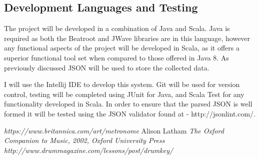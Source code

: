 \documentclass[a4paper, 11pt]{article}
\begin{document}
\subsection{Development Languages and Testing}
The project will be developed in a combination of Java and Scala. Java is required as both the Beatroot and JWave libraries are in this language, however any functional aspects of the project will be developed in Scala, as it offers a superior functional tool set when compared to those offered in Java 8. As previously discussed JSON will be used to store the collected data.

I will use the Intellij IDE to develop this system. Git will be used for version control, testing will be completed using JUnit for Java, and Scala Test for any functionality developed in Scala. In order to ensure that the parsed JSON is well formed it will be tested using the JSON validator found at - http://jsonlint.com/.



\clearpage



\begin{thebibliography}{99}
\textit{https://www.britannica.com/art/metronome}
Alison Latham
\textit{The Oxford Companion to Music, 2002, Oxford University Press}
\textit{http://www.drummagazine.com/lessons/post/drumkey/}

\end{thebibliography}
\end{document}
